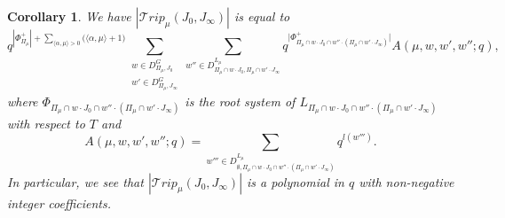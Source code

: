 \documentclass{amsart}
\newcommand{\cE}{\mathcal{E}}
\theoremstyle{plain}
\newtheorem{corollary}{Corollary}[theorem]
\theoremstyle{definition}
\theoremstyle{remark}
\DeclareMathOperator{\aut}{Aut}
\begin{document}
\begin{corollary}\label{explicit}
We have $|\mathcal{T}rip_\mu(J_{0},J_{\infty})|$ is equal to
\[
q^{|\Phi_{\Pi_{\mu}}^{+}|+\sum_{\langle\alpha,\mu\rangle>0}\big(\langle\alpha,\mu\rangle+1\big)}\displaystyle\sum_{\substack{w\in D^{G}_{\Pi_{\mu},J_{0}}
\\
w'\in D^{G}_{\Pi_{\mu},J_{\infty}}}}\sum_{w''\in D^{L_{\mu}}_{\Pi_{\mu}\cap w\cdot J_{0},\Pi_{\mu}\cap w'\cdot J_{\infty}}}q^{\big|\Phi_{\Pi_{\mu}\cap w\cdot J_{0}\cap w''\cdot(\Pi_{\mu}\cap w'\cdot J_{\infty})}^{+}\big|}A(\mu,w,w',w'';q),
\] 
where $\Phi_{\Pi_{\mu}\cap w\cdot J_{0}\cap w''\cdot(\Pi_{\mu}\cap w'\cdot J_{\infty})}$ is the root system of $L_{\Pi_{\mu}\cap w\cdot J_{0}\cap w''\cdot(\Pi_{\mu}\cap w'\cdot J_{\infty})}$ with respect to $T$ and 
\[
A(\mu,w,w',w'';q)=
\sum_{w'''\in D^{L_{\mu}}_{\emptyset,\Pi_{\mu}\cap w\cdot J_{0}\cap w''\cdot(\Pi_{\mu}\cap w'\cdot J_{\infty})}}q^{l(w''')}.
\]
In particular, we see that $|\mathcal{T}rip_\mu(J_{0},J_{\infty})|$ is a polynomial in $q$ with non-negative integer coefficients.
\end{corollary}
\end{document}
